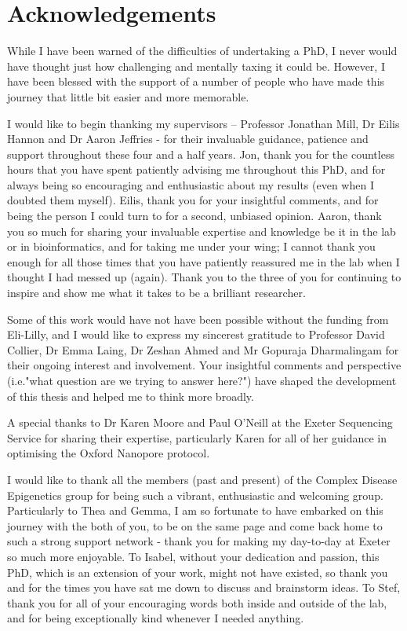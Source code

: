\chapter*{Acknowledgements}

\begingroup
\singlespacing
While I have been warned of the difficulties of undertaking a PhD, I never would have thought just how challenging and mentally taxing it could be. However, I have been blessed with the support of a number of people who have made this journey that little bit easier and more memorable. 

I would like to begin thanking my supervisors – Professor Jonathan Mill, Dr Eilis Hannon and Dr Aaron Jeffries - for their invaluable guidance, patience and support throughout these four and a half years. Jon, thank you for the countless hours that you have spent patiently advising me throughout this PhD, and for always being so encouraging and enthusiastic about my results (even when I doubted them myself). Eilis, thank you for your insightful comments, and for being the person I could turn to for a second, unbiased opinion. Aaron, thank you so much for sharing your invaluable expertise and knowledge be it in the lab or in bioinformatics, and for taking me under your wing; I cannot thank you enough for all those times that you have patiently reassured me in the lab when I thought I had messed up (again). Thank you to the three of you for continuing to inspire and show me what it takes to be a brilliant researcher. 

Some of this work would have not have been possible without the funding from Eli-Lilly, and I would like to express my sincerest gratitude to Professor David Collier, Dr Emma Laing, Dr Zeshan Ahmed and Mr Gopuraja Dharmalingam for their ongoing interest and involvement. Your insightful comments and perspective (i.e."what question are we trying to answer here?") have shaped the development of this thesis and helped me to think more broadly. 

A special thanks to Dr Karen Moore and Paul O’Neill at the  Exeter Sequencing Service for sharing their expertise, particularly Karen for all of her guidance in optimising the Oxford Nanopore protocol.

I would like to thank all the members (past and present) of the Complex Disease Epigenetics group for being such a vibrant, enthusiastic and welcoming group. Particularly to Thea and Gemma, I am so fortunate to have embarked on this journey with the both of you, to be on the same page and come back home to such a strong support network - thank you for making my day-to-day at Exeter so much more enjoyable. To Isabel, without your dedication and passion, this PhD, which is an extension of your work, might not have existed, so thank you and for the times you have sat me down to discuss and brainstorm ideas. To Stef, thank you for all of your encouraging words both inside and outside of the lab, and for being exceptionally kind whenever I needed anything. 

